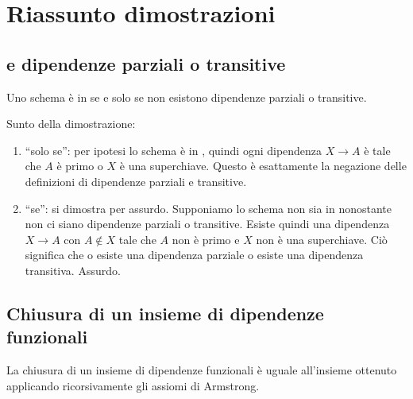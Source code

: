 \chapter{Riassunto dimostrazioni}

\section{ e dipendenze parziali o transitive}

Uno schema \`e in  se e solo se non esistono dipendenze parziali o transitive.

Sunto della dimostrazione:
\begin{enumerate}
    \item ``solo se'': per ipotesi lo schema \`e in , quindi ogni dipendenza $X \to A$ \`e tale che $A$ \`e primo o $X$ \`e una superchiave. Questo \`e esattamente la negazione delle definizioni di dipendenze parziali e transitive.
    \item ``se'': si dimostra per assurdo. Supponiamo lo schema non sia in  nonostante non ci siano dipendenze parziali o transitive. Esiste quindi una dipendenza $X \to A$ con $A \notin X$ tale che $A$ non \`e primo e $X$ non \`e una superchiave. Ci\`o significa che o esiste una dipendenza parziale o esiste una dipendenza transitiva. Assurdo.
\end{enumerate}

\section{Chiusura di un insieme di dipendenze funzionali}

La chiusura di un insieme di dipendenze funzionali \`e uguale all'insieme ottenuto applicando ricorsivamente gli assiomi di Armstrong.

